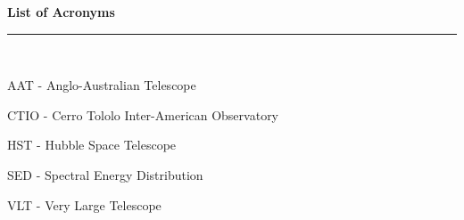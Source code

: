 \thispagestyle{empty}
\begin{raggedleft}
\vspace*{23mm}
\hfill {\huge {\bf {List of Acronyms}}} \\
\vspace{6mm}
\hfill \rule{4in}{.015in} \\
\vspace{19mm}
\end{raggedleft}




%
%

AAT - Anglo-Australian Telescope

CTIO - Cerro Tololo Inter-American Observatory

HST - Hubble Space Telescope

SED - Spectral Energy Distribution

VLT - Very Large Telescope
